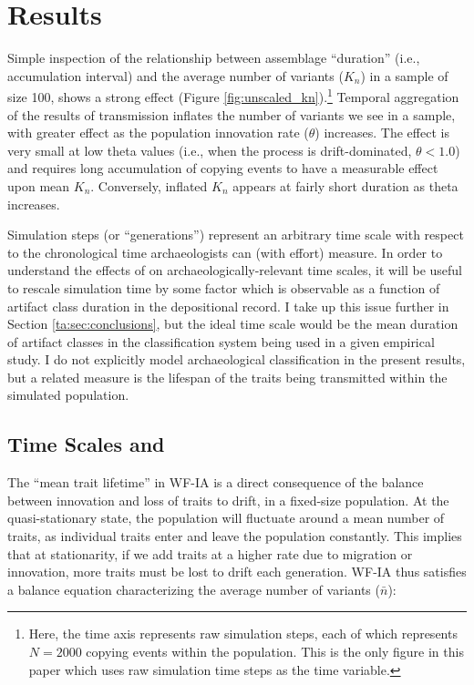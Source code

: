 \section{Results}
\label{ta:sec:results}

Simple inspection of the relationship between assemblage ``duration'' (i.e., accumulation interval) and the average number of variants ($K_n$) in a sample of size 100, shows a strong \timeav effect (Figure \ref{fig:unscaled_kn}).\footnote{Here, the time axis represents raw simulation steps, each of which represents $N = 2000$ copying events within the population.  This is the only figure in this paper which uses raw simulation time steps as the time variable.}  Temporal aggregation of the results of transmission inflates the number of variants we see in a sample, with greater effect as the population innovation rate ($\theta$) increases.  The effect is very small at low theta values (i.e., when the process is drift-dominated, $\theta < 1.0$) and requires long accumulation of copying events to have a measurable effect upon mean $K_n$.  
Conversely, inflated $K_n$ appears at fairly short duration as theta increases.  

Simulation steps (or ``generations'') represent an arbitrary time scale with respect to the chronological time archaeologists can (with effort) measure.   In order to understand the effects of \timeav on archaeologically-relevant time scales, it will be useful to rescale simulation time by some factor which is observable as a function of artifact class duration in the depositional record.  I take up this issue further in Section \ref{ta:sec:conclusions}, but the ideal time scale would be the mean duration of artifact classes in the classification system being used in a given empirical study.   I do not explicitly model archaeological classification in the present results, but a related measure is the lifespan of the traits being transmitted within the simulated population.  

\subsection{Time Scales and \Timeav}

The ``mean trait lifetime'' in WF-IA is a direct consequence of the balance between innovation and loss of traits to drift, in a fixed-size population.  At the quasi-stationary state, the population will fluctuate around a mean number of traits, as individual traits enter and leave the population constantly.  This implies that at stationarity, if we add traits at a higher rate due to migration or innovation, more traits must be lost to drift each generation.  WF-IA thus satisfies a balance equation characterizing the average number of variants ($\bar{n}$)\citep{ewens1964maintenance}:

